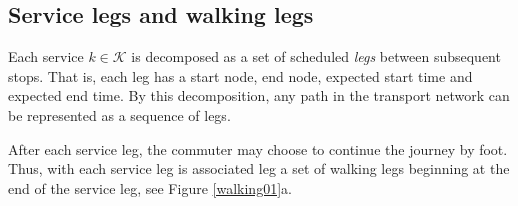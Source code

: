 \documentclass[dissertation,draft*]{aaltoseries}
\begin{document}
\subsection{Service legs and walking legs}
Each service $k \in \mathcal{K}$ is decomposed as a set of scheduled \emph{legs} between subsequent stops.
That is, each leg has a start node, end node, expected start time and expected end time.
By this decomposition, any path in the transport network can be represented as a sequence 
of legs. 
% 

After each service leg, the commuter may choose to continue the journey by foot. 
Thus, with each service leg is associated leg a set of walking legs beginning at the end of the service leg, 
see Figure \ref{walking01}a. 
\end{document}
